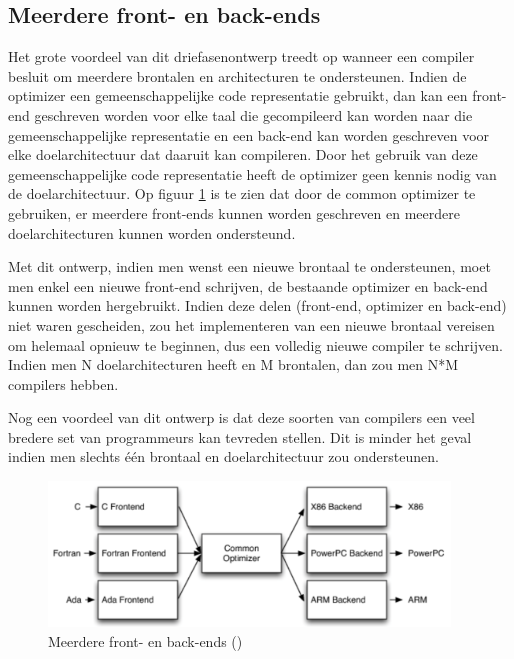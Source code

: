 \subsection{Meerdere front- en back-ends}
Het grote voordeel van dit driefasenontwerp treedt op wanneer een compiler besluit om meerdere brontalen en architecturen te ondersteunen. Indien de optimizer een gemeenschappelijke code representatie gebruikt, dan kan een front-end geschreven worden voor elke taal die gecompileerd kan worden naar die gemeenschappelijke representatie en een back-end kan worden geschreven voor elke doelarchitectuur dat daaruit kan compileren. Door het gebruik van deze gemeenschappelijke code representatie heeft de optimizer geen kennis nodig van de doelarchitectuur. Op figuur \ref{fig:llvmdriefasen} is te zien dat door de common optimizer te gebruiken, er meerdere front-ends kunnen worden geschreven en meerdere doelarchitecturen kunnen worden ondersteund.

Met dit ontwerp, indien men wenst een nieuwe brontaal te ondersteunen, moet men enkel een nieuwe front-end schrijven, de bestaande optimizer en back-end kunnen worden hergebruikt. Indien deze delen (front-end, optimizer en back-end) niet waren gescheiden, zou het implementeren van een nieuwe brontaal vereisen om helemaal opnieuw te beginnen, dus een volledig nieuwe compiler te schrijven. Indien men N doelarchitecturen heeft en M brontalen, dan zou men N*M compilers hebben.

Nog een voordeel van dit ontwerp is dat deze soorten van compilers een veel bredere set van programmeurs kan tevreden stellen. Dit is minder het geval indien men slechts één brontaal en doelarchitectuur zou ondersteunen. 

\begin{figure} [ht]
	\centering
	\includegraphics[width=0.95\textwidth]{img/llvmdriefasen}
	\caption{Meerdere front- en back-ends (\cite{aosa})}
	\label{fig:llvmdriefasen}
\end{figure}

